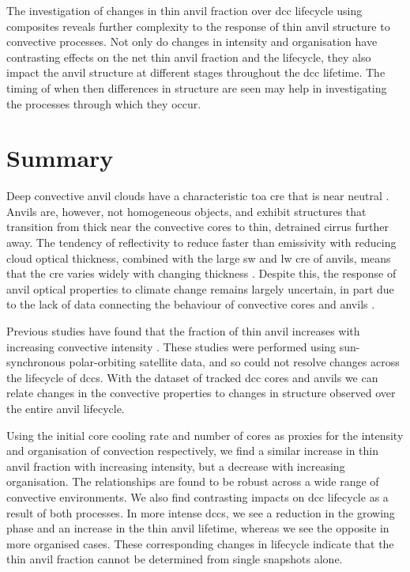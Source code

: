 The investigation of changes in thin anvil fraction over \acrshort{dcc} lifecycle using composites reveals further complexity to the response of thin anvil structure to convective processes.
Not only do changes in intensity and organisation have contrasting effects on the net thin anvil fraction and the lifecycle, they also impact the anvil structure at different stages throughout the \acrshort{dcc} lifetime.
The timing of when then differences in structure are seen may help in investigating the processes through which they occur.


\section{Summary}

Deep convective anvil clouds have a characteristic \acrshort{toa} \acrshort{cre} that is near neutral \citep{hartmann_tropical_2016}.
Anvils are, however, not homogeneous objects, and exhibit structures that transition from thick near the convective cores to thin, detrained cirrus further away.
The tendency of reflectivity to reduce faster than emissivity with reducing cloud optical thickness, combined with the large \acrshort{sw} and \acrshort{lw} \acrshort{cre} of anvils, means that the \acrshort{cre} varies widely with changing thickness \citep{berry_cloud_2014}.
Despite this, the response of anvil optical properties to climate change remains largely uncertain, in part due to the lack of data connecting the behaviour of convective cores and anvils \cite{gasparini_opinion_2023}.

Previous studies have found that the fraction of thin anvil increases with increasing convective intensity \citep{protopapadaki_upper_2017, takahashi_relationships_2017}.
These studies were performed using sun-synchronous polar-orbiting satellite data, and so could not resolve changes across the lifecycle of \acrshort{dcc}s.
With the dataset of tracked \acrshort{dcc} cores and anvils we can relate changes in the convective properties to changes in structure observed over the entire anvil lifecycle.

Using the initial core cooling rate and number of cores as proxies for the intensity and organisation of convection respectively, we find a similar increase in thin anvil fraction with increasing intensity, but a decrease with increasing organisation.
The relationships are found to be robust across a wide range of convective environments.
We also find contrasting impacts on \acrshort{dcc} lifecycle as a result of both processes.
In more intense \acrshort{dcc}s, we see a reduction in the growing phase and an increase in the thin anvil lifetime, whereas we see the opposite in more organised cases.
These corresponding changes in lifecycle indicate that the thin anvil fraction cannot be determined from single snapshots alone.


